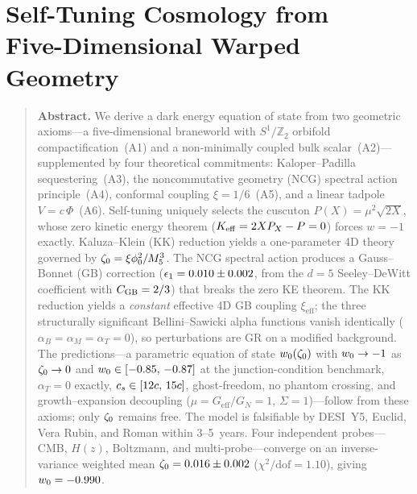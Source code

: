 
\chapter[Self-Tuning Cosmology from 5D Warped Geometry]{Self-Tuning Cosmology from\\Five-Dimensional Warped Geometry}
\label{ch:foundation}

\begin{quote}
\textbf{Abstract.}
We derive a dark energy equation of state from two geometric axioms---a five-dimensional braneworld with $S^1/\mathbb{Z}_2$ orbifold compactification~(A1) and a non-minimally coupled bulk scalar~(A2)---supplemented by four theoretical commitments: Kaloper--Padilla sequestering~(A3), the noncommutative geometry (NCG) spectral action principle~(A4), conformal coupling $\xi = 1/6$~(A5), and a linear tadpole $V = c\,\Phi$~(A6). Self-tuning uniquely selects the cuscuton $P(X) = \mu^2\sqrt{2X}$, whose zero kinetic energy theorem ($K_{\mathrm{eff}} = 2XP_X - P = 0$) forces $w = -1$ exactly. Kaluza--Klein (KK) reduction yields a one-parameter 4D theory governed by $\zeta_0 = \xi\phi_0^2/M_5^3$. The NCG spectral action produces a Gauss--Bonnet (GB) correction ($\epsilon_1 = 0.010 \pm 0.002$, from the $d = 5$ Seeley--DeWitt coefficient with $C_{\mathrm{GB}} = 2/3$) that breaks the zero KE theorem. The KK reduction yields a \emph{constant} effective 4D GB coupling $\xi_{\mathrm{eff}}$; the three structurally significant Bellini--Sawicki alpha functions vanish identically ($\alpha_B = \alpha_M = \alpha_T = 0$), so perturbations are GR on a modified background. The predictions---a parametric equation of state $w_0(\zeta_0)$ with $w_0 \to -1$ as $\zeta_0 \to 0$ and $w_0 \in [-0.85,\, -0.87]$ at the junction-condition benchmark, $\alpha_T = 0$ exactly, $c_s \in [12c,\, 15c]$, ghost-freedom, no phantom crossing, and growth--expansion decoupling ($\mu = G_{\mathrm{eff}}/G_N = 1$, $\Sigma = 1$)---follow from these axioms; only $\zeta_0$ remains free. The model is falsifiable by DESI~Y5, Euclid, Vera Rubin, and Roman within 3--5~years. Four independent probes---CMB, $H(z)$, Boltzmann, and multi-probe---converge on an inverse-variance weighted mean $\zeta_0 = 0.016 \pm 0.002$ ($\chi^2/\mathrm{dof} = 1.10$), giving $w_0 = -0.990$.
\end{quote}

